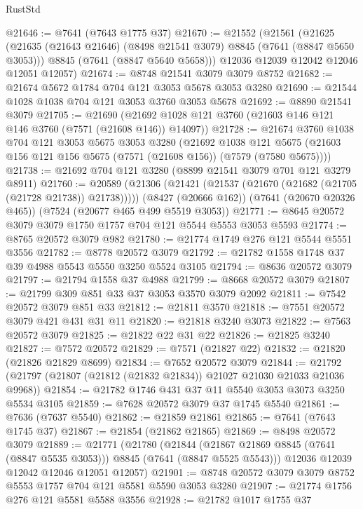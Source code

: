 \begin{lexlean}{RustStd}
\begin{coremodule}
@21646 := @7641 (@7643 @1775 @37)
@21670 := @21552
    (@21561
      (@21625
        (@21635 (@21643 @21646) (@8498 @21541 @3079) @8845 (@7641 (@8847 @5650 @3053)))
        @8845
        (@7641 (@8847 @5640 @5658)))
      @12036
      @12039
      @12042
      @12046
      @12051
      @12057)
@21674 := @8748 @21541 @3079 @3079 @8752
@21682 := @21674 @5672 @1784 @704 @121 @3053 @5678 @3053 @3280
@21690 := @21544 @1028 @1038 @704 @121 @3053 @3760 @3053 @5678
@21692 := @8890 @21541 @3079
@21705 := @21690
    (@21692 @1028 @121 @3760 (@21603 @146 @121 @146 @3760 (@7571 (@21608 @146)) @14097))
@21728 := @21674
    @3760
    @1038
    @704
    @121
    @3053
    @5675
    @3053
    @3280
    (@21692
      @1038
      @121
      @5675
      (@21603 @156 @121 @156 @5675 (@7571 (@21608 @156)) (@7579 (@7580 @5675))))
@21738 := @21692 @704 @121 @3280 (@8899 @21541 @3079 @701 @121 @3279 @8911)
@21760 := @20589
    (@21306 (@21421 (@21537 (@21670 (@21682 (@21705 (@21728 @21738)) @21738)))))
    (@8427 (@20666 @162))
    (@7641 (@20670 @20326 @465))
    (@7524 (@20677 @465 @499 @5519 @3053))
@21771 := @8645 @20572 @3079 @3079 @1750 @1757 @704 @121 @5544 @5553 @3053 @5593
@21774 := @8765 @20572 @3079 @982
@21780 := @21774 @1749 @276 @121 @5544 @5551 @3556
@21782 := @8778 @20572 @3079
@21792 := @21782 @1558 @1748 @37 @39 @4988 @5543 @5550 @3250 @5524 @3105
@21794 := @8636 @20572 @3079
@21797 := @21794 @1558 @37 @4988
@21799 := @8668 @20572 @3079
@21807 := @21799 @309 @851 @33 @37 @3053 @3570 @3079 @2092
@21811 := @7542 @20572 @3079 @851 @33
@21812 := @21811 @3570
@21818 := @7551 @20572 @3079 @421 @431 @31 @11
@21820 := @21818 @3240 @3073
@21822 := @7563 @20572 @3079
@21825 := @21822 @22 @31 @22
@21826 := @21825 @3240
@21827 := @7572 @20572
@21829 := @7571 (@21827 @22)
@21832 := @21820 (@21826 @21829 @8699)
@21834 := @7652 @20572 @3079
@21844 := @21792 (@21797 (@21807 (@21812 (@21832 @21834)) @21027 @21030 @21033 @21036 @9968))
@21854 := @21782 @1746 @431 @37 @11 @5540 @3053 @3073 @3250 @5534 @3105
@21859 := @7628 @20572 @3079 @37 @1745 @5540
@21861 := @7636 (@7637 @5540)
@21862 := @21859 @21861
@21865 := @7641 (@7643 @1745 @37)
@21867 := @21854 (@21862 @21865)
@21869 := @8498 @20572 @3079
@21889 := @21771
    (@21780
      (@21844 (@21867 @21869 @8845 (@7641 (@8847 @5535 @3053))) @8845 (@7641 (@8847 @5525 @5543)))
      @12036
      @12039
      @12042
      @12046
      @12051
      @12057)
@21901 := @8748 @20572 @3079 @3079 @8752 @5553 @1757 @704 @121 @5581 @5590 @3053 @3280
@21907 := @21774 @1756 @276 @121 @5581 @5588 @3556
@21928 := @21782
    @1017
    @1755
    @37

\end{coremodule}
\end{lexlean}
